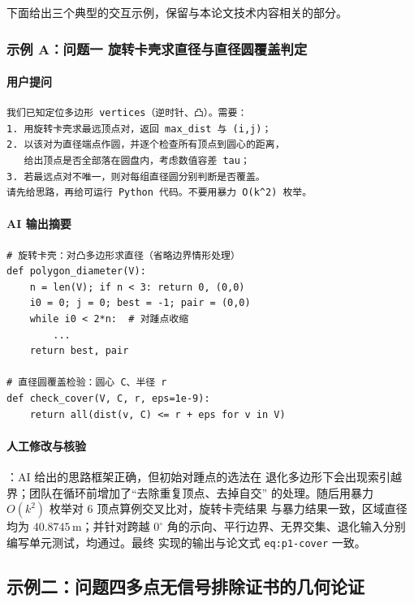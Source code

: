 \documentclass[UTF8,a4paper,12pt]{ctexart}
\begin{document}
下面给出三个典型的交互示例，保留与本论文技术内容相关的部分。

\subsubsection{示例 A：问题一 旋转卡壳求直径与直径圆覆盖判定}

\paragraph{用户提问}
\begin{lstlisting}[style=ai]
我们已知定位多边形 vertices（逆时针、凸）。需要：
1. 用旋转卡壳求最远顶点对，返回 max_dist 与 (i,j)；
2. 以该对为直径端点作圆，并逐个检查所有顶点到圆心的距离，
   给出顶点是否全部落在圆盘内，考虑数值容差 tau；
3. 若最远点对不唯一，则对每组直径圆分别判断是否覆盖。
请先给思路，再给可运行 Python 代码。不要用暴力 O(k^2) 枚举。
\end{lstlisting}

\paragraph{AI 输出摘要}
\begin{lstlisting}[style=AI]
# 旋转卡壳：对凸多边形求直径（省略边界情形处理）
def polygon_diameter(V):
    n = len(V); if n < 3: return 0, (0,0)
    i0 = 0; j = 0; best = -1; pair = (0,0)
    while i0 < 2*n:  # 对踵点收缩
        ...
    return best, pair

# 直径圆覆盖检验：圆心 C、半径 r
def check_cover(V, C, r, eps=1e-9):
    return all(dist(v, C) <= r + eps for v in V)
\end{lstlisting}

\paragraph{人工修改与核验}：AI 给出的思路框架正确，但初始对踵点的选法在
退化多边形下会出现索引越界；团队在循环前增加了“去除重复顶点、去掉自交”
的处理。随后用暴力 $O(k^2)$ 枚举对 6 顶点算例交叉比对，旋转卡壳结果
与暴力结果一致，区域直径均为 $40.8745\,\mathrm{m}$；并针对跨越 $0^\circ$
角的示向、平行边界、无界交集、退化输入分别编写单元测试，均通过。最终
实现的输出与论文式 \texttt{eq:p1-cover} 一致。

\subsection{示例二：问题四多点无信号排除证书的几何论证}
\end{document}
